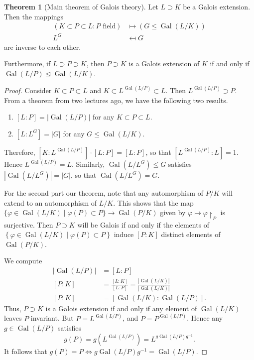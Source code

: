 \documentclass[10pt,letterpaper,cm]{nupset}
\theoremstyle{definition}
\theoremstyle{theorem}
\newtheorem{theorem}[definition]{Theorem}
\theoremstyle{remark}
\newcommand{\1}{\mathbf{1}}
\newcommand{\0}{\vec 0}
\DeclareMathOperator{\gal}{Gal}
\begin{document}
\begin{theorem}[Main theorem of Galois theory]
Let $L \supset K$ be a Galois extension. Then the mappings 
\begin{align*}
\left(K \subset P \subset L : P \text{ field}\right) &\mapsto \left(G \leq \gal(L/K)\right) 
\\ L^G &\mapsfrom G
\end{align*}
 are inverse to each other. 

Furthermore, if $L \supset P \supset K$, then $P \supset K$ is a Galois extension of $K$ if and only if $\gal(L/P) \unlhd \gal(L/K)$. 
\end{theorem}
\begin{proof}
Consider $K \subset P \subset L$ and $K \subset L^{\gal(L/P)} \subset L$. Then $L^{\gal(L/P)}\supset P$. From a theorem from two lectures ago, we have the following two results.
\begin{enumerate}[label=(\alph*)]
\item $[L:P] = \left\lvert{\gal(L/P)}\right\rvert$ for any $K \subset P \subset L$. 
\item $[L: L^G] = \left\lvert{G}\right\rvert$ for any $G \leq \gal(L/K)$. 
\end{enumerate}
Therefore, $\left[K: L^{\gal(L/P)}\right]\cdot \left[L:P\right] = \left[L:P\right]$, so that $\left[L^{\gal(L/P)} : L\right]= 1$. Hence $L^{\gal(L/P)} = L$. Similarly, $\gal(L/L^G) \leq G$ satisfies $\left\lvert{\gal(L/L^G)}\right\rvert = \left\lvert{G}\right\rvert$, so that $\gal(L/L^G) = G$. 

\medskip


For the second part  our theorem, note that any automorphism of $P/K$ will extend to an automorphism of $L/K$. This shows that the map $\{\varphi \in \gal(L/K) \mid \varphi(P) \subset P\} \to \gal(P/K)$ given by $\varphi \mapsto \varphi \restriction_P$ is surjective. Then $P \supset K$ will be Galois if and only if the elements of $\left\{\varphi \in \gal(L/K) \mid \varphi(P) \subset P\right\}$ induce $[P:K]$ distinct elements of $\gal(P/K)$. 

\medskip


We compute
\begin{align*}
\left\lvert{\gal(L/P)}\right\rvert & = [L:P]
\\ [P:K] & = \frac{[L:K]}{[L:P]} = \frac{\left\lvert{\gal(L/K)}\right\rvert}{\left\lvert{\gal(L/K)}\right\rvert}
\\ [P:K] & = [\gal(L/K) : \gal(L/P)].
\end{align*}
Thus, $P \supset K$ is a Galois extension if and only if any element of $\gal(L/K)$ leaves $P$ invariant. But $P = L^{\gal(L/P)}$, and $P = P^{\gal(L/P)}$. Hence any $g \in \gal(L/P)$ satisfies $$g(P) = g(L^{\gal(L/P)}) = L^{g\gal(L/P)g^{-1}}.$$ It follows that $g(P) = P \iff g\gal(L/P)g^{-1} = \gal(L/P)$.
\end{proof}
\end{document}
